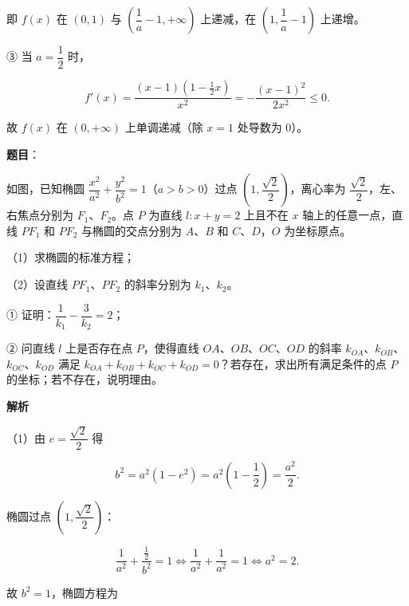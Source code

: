 \begin{answer}
即 $f(x)$ 在 $(0,1)$ 与 $\left(\dfrac1a-1,+\infty\right)$ 上递减，在 $\left(1,\dfrac1a-1\right)$ 上递增。

③ 当 $a=\dfrac12$ 时，

\nopagebreak[4]
\[f'(x)=\frac{(x-1)\left(1-\frac12x\right)}{x^2}
=-\frac{(x-1)^2}{2x^2}\leqslant0.\]

故 $f(x)$ 在 $(0,+\infty)$ 上单调递减（除 $x=1$ 处导数为 $0$）。


\end{answer}
\begin{answer}

\textbf{题目}：

如图，已知椭圆 $\dfrac{x^2}{a^2}+\dfrac{y^2}{b^2}=1$（$a>b>0$）过点 $\left(1,\dfrac{\sqrt2}2\right)$，离心率为 $\dfrac{\sqrt2}2$，左、右焦点分别为 $F_1$、$F_2$。点 $P$ 为直线 $l:x+y=2$ 上且不在 $x$ 轴上的任意一点，直线 $PF_1$ 和 $PF_2$ 与椭圆的交点分别为 $A$、$B$ 和 $C$、$D$，$O$ 为坐标原点。

（1）求椭圆的标准方程；

（2）设直线 $PF_1$、$PF_2$ 的斜率分别为 $k_1$、$k_2$。

① 证明：$\dfrac1{k_1}-\dfrac3{k_2}=2$；

② 问直线 $l$ 上是否存在点 $P$，使得直线 $OA$、$OB$、$OC$、$OD$ 的斜率 $k_{OA}$、$k_{OB}$、$k_{OC}$、$k_{OD}$ 满足 $k_{OA}+k_{OB}+k_{OC}+k_{OD}=0$？若存在，求出所有满足条件的点 $P$ 的坐标；若不存在，说明理由。
\nopagebreak[4]
\begin{center}\end{center}
\nopagebreak[4]
\textbf{解析}

（1）由 $e=\dfrac{\sqrt2}2$ 得

\nopagebreak[4]
\[b^2=a^2(1-e^2)=a^2\left(1-\frac12\right)=\frac{a^2}2.\]

椭圆过点 $\left(1,\dfrac{\sqrt2}2\right)$：

\nopagebreak[4]
\[\frac1{a^2}+\frac{\frac12}{b^2}=1
\iff \frac1{a^2}+\frac1{a^2}=1
\iff a^2=2.\]

故 $b^2=1$，椭圆方程为


\end{answer}
